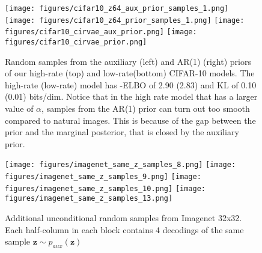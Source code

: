 \documentclass{article} \usepackage{iclr2019_conference,times}
\def\rvz{{\mathbf{z}}}
\begin{document}
\begin{figure}[h!]
    \centering
    \texttt{[image: figures/cifar10\_z64\_aux\_prior\_samples\_1.png]}
    \texttt{[image: figures/cifar10\_z64\_prior\_samples\_1.png]}
    \texttt{[image: figures/cifar10\_cirvae\_aux\_prior.png]}
    \texttt{[image: figures/cifar10\_cirvae\_prior.png]}
    \label{fig:more-imagenet-samez}
    \caption{Random samples from the auxiliary (left) and AR(1) (right)  priors 
     of our high-rate (top) and low-rate(bottom) CIFAR-10 models.
     The high-rate (low-rate) model has -ELBO of 2.90 (2.83) and KL of 0.10 (0.01) bits/dim.
     Notice that in the high rate model that has a larger value of $\alpha$, samples from the AR(1)
     prior can turn out too smooth compared to natural images. This is because of the gap between the prior
     and the marginal posterior, that is closed by the auxiliary prior.}
\end{figure}



\begin{figure}[h!]
    \centering
    \texttt{[image: figures/imagenet\_same\_z\_samples\_8.png]}
    \texttt{[image: figures/imagenet\_same\_z\_samples\_9.png]}
    \texttt{[image: figures/imagenet\_same\_z\_samples\_10.png]}
    \texttt{[image: figures/imagenet\_same\_z\_samples\_13.png]}
    \label{fig:more-imagenet-samez}
    \caption{Additional unconditional random samples from Imagenet 32x32. 
    Each half-column in each block contains 4 decodings of the same sample $\rvz \sim p_{aux}(\rvz)$}
\end{figure}
\end{document}
